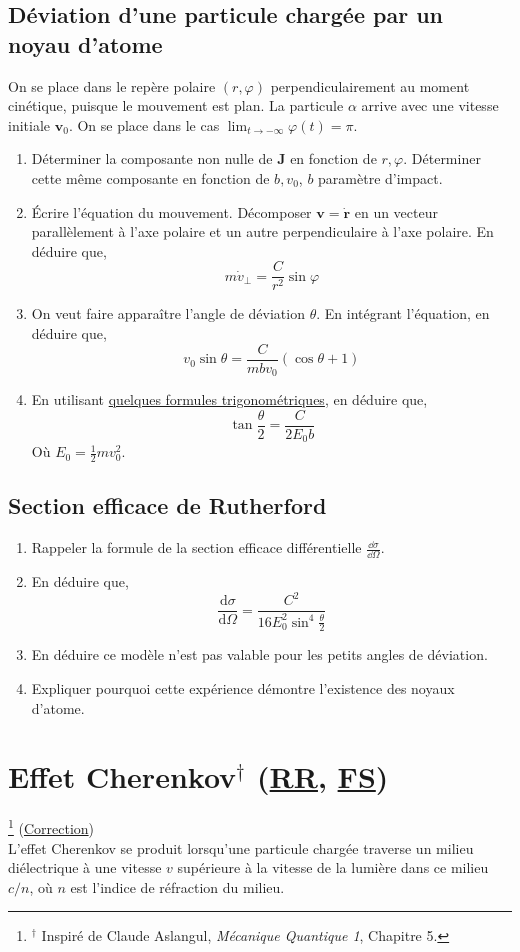\documentclass[a4paper,10pt]{report}
\begin{document}
\subsection{Déviation d'une particule chargée par un noyau d'atome}
On se place dans le repère polaire $(r, \varphi)$ perpendiculairement au moment cinétique, puisque le mouvement est plan. La particule $\alpha$ arrive avec une vitesse initiale $\textbf{v}_0$. On se place dans le cas $\lim_{t \to -\infty} \varphi(t) = \pi$.
\begin{enumerate}
	\item Déterminer la composante non nulle de $\textbf{J}$ en fonction de $r, \varphi$. Déterminer cette même composante en fonction de $b, v_0$, $b$ paramètre d'impact.
	\item Écrire l'équation du mouvement.
	 Décomposer $\textbf{v} = \dot{\textbf{r}}$ en un vecteur parallèlement à l'axe polaire et un autre perpendiculaire à l'axe polaire. En déduire que,
	$$m\dot{v}_{\perp} = \frac C {r^2}\sin\varphi$$
	\item On veut faire apparaître l'angle de déviation $\theta$.
	En intégrant l'équation, en déduire que,
	$$v_0\sin\theta = \frac C {mbv_0}(\cos\theta + 1)$$
	\item En utilisant  \hyperref[subsubsec:trigo]{quelques formules trigonométriques}, en déduire que,
	$$\tan\frac \theta 2 = \frac  C {2E_0b}$$
	Où $E_0 = \frac 1 2 m v_0^2$. 
\end{enumerate}
\subsection{Section efficace de Rutherford}
\begin{enumerate}
	\item Rappeler la formule de la section efficace différentielle $\frac {\dd \sigma}{\dd \Omega}$.
	\item En déduire que, $$\frac {\text{d}\sigma}{\text{d}\Omega} = \frac {C^2}{16E_0^2\sin^4\frac \theta 2}$$
	\item En déduire ce modèle n'est pas valable pour les petits angles de déviation.
	\item Expliquer pourquoi cette expérience démontre l'existence des noyaux d'atome.
\end{enumerate}
\newpage
	\section[Effet Cherenkov]{Effet Cherenkov$^\dag$ (\hyperref[subsubsec:relativite]{RR}, \hyperref[subsubsec:subatomique]{FS})\space \faStar\faStar\faStar}\footnote{$^\dag$ Inspiré de Claude Aslangul, \textit{Mécanique Quantique 1}, Chapitre 5.}\label{subsec:Cherenkov}
	(\hyperref[subsec:correctionCherenkov]{Correction})
\\L'effet Cherenkov se produit lorsqu'une particule chargée traverse un milieu diélectrique à une vitesse \( v \) supérieure à la vitesse de la lumière dans ce milieu \( c/n \), où \( n \) est l'indice de réfraction du milieu.
		
\end{document}

